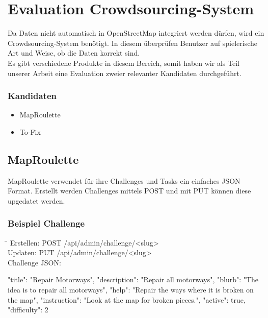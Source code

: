 \newpage
\section{Evaluation Crowdsourcing-System}
\label{sec:crowdsourcing}
Da Daten nicht automatisch in OpenStreetMap integriert werden dürfen, wird ein Crowdsourcing-System benötigt. In diesem überprüfen Benutzer auf spielerische Art und Weise, ob die Daten korrekt sind.\\
Es gibt verschiedene Produkte in diesem Bereich, somit haben wir als Teil unserer Arbeit eine Evaluation zweier relevanter Kandidaten durchgeführt.
\subsubsection{Kandidaten}
\begin{itemize}
	\item MapRoulette \cite{MapRoulette}
	\item To-Fix \cite{To-Fix}
\end{itemize}

\subsection{MapRoulette}
\label{subsec:MapRoulette}
\Gls{MapRoulette} verwendet für ihre Challenges und Tasks ein einfaches JSON Format. Erstellt werden Challenges mittels POST und mit PUT können diese upgedatet werden.

\subsubsection{Beispiel Challenge}
\begin{tabbing}
    \hspace*{4cm}\=\hspace*{5cm}\= \kill
    Erstellen: \> POST /api/admin/challenge/<slug>  \\
    Updaten: \> PUT /api/admin/challenge/<slug> \\
    Challenge JSON: \\
\end{tabbing}		
\begin{python}
{
  "title": "Repair Motorways",
  "description": "Repair all motorways",
  "blurb": "The idea is to repair all motorways",
  "help": "Repair the ways where it is broken on the map",
  "instruction": "Look at the map for broken pieces.",
  "active": true,
  "difficulty": 2
}
\end{python}
\newpage
